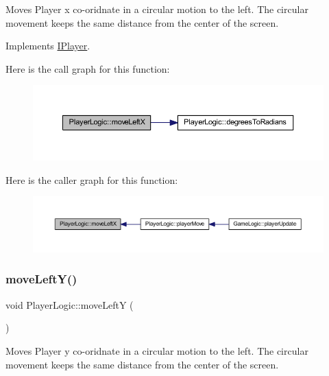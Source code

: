 Moves Player x co-\/oridnate in a circular motion to the left. The circular movement keeps the same distance from the center of the screen. 



Implements \hyperlink{class_i_player_a46d098eef1da625e555852341ced76c9}{I\+Player}.

Here is the call graph for this function\+:\nopagebreak
\begin{figure}[H]
\begin{center}
\leavevmode
\includegraphics[width=350pt]{class_player_logic_ac4d252e80757e05b5799ab689ee27d5e_cgraph}
\end{center}
\end{figure}
Here is the caller graph for this function\+:
\nopagebreak
\begin{figure}[H]
\begin{center}
\leavevmode
\includegraphics[width=350pt]{class_player_logic_ac4d252e80757e05b5799ab689ee27d5e_icgraph}
\end{center}
\end{figure}
\mbox{\label{class_player_logic_a006a7633ae5839d307bb90099f9d2745}} 
\subsubsection{\texorpdfstring{move\+Left\+Y()}{moveLeftY()}}
{\footnotesize\ttfamily void Player\+Logic\+::move\+LeftY (\begin{DoxyParamCaption}{ }\end{DoxyParamCaption})\hspace{0.3cm}{\ttfamily [virtual]}}



Moves Player y co-\/oridnate in a circular motion to the left. The circular movement keeps the same distance from the center of the screen. 



